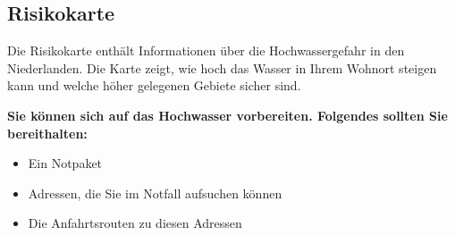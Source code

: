 \subsection{Risikokarte}
\textnormal{Die Risikokarte enthält Informationen über die Hochwassergefahr in den Niederlanden. 
Die Karte zeigt, wie hoch das Wasser in Ihrem Wohnort steigen kann und welche höher gelegenen Gebiete sicher sind.
}

\textnormal{\newline\bfseries Sie können sich auf das Hochwasser vorbereiten. 
Folgendes sollten Sie bereithalten:}
 
\begin{itemize}  
\item Ein Notpaket
\item Adressen, die Sie im Notfall aufsuchen können
\item Die Anfahrtsrouten zu diesen Adressen
\end{itemize}  

